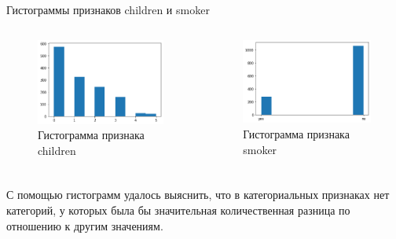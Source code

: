\documentclass[c]{beamer}  %
\begin{document}
	\begin{frame}
		\frametitle{\insertsection}

		\begin{block}{Гистограммы признаков children и smoker}
			\begin{columns}[onlytextwidth,T]
				\begin{figure}[H]
					\centering
					\includegraphics[scale=0.35]{children_hist.png}
					\caption{Гистограмма признака children}
					\label{img:children_hist}
				\end{figure}
				\begin{figure}[H]
					\centering
					\includegraphics[scale=0.35]{smoker_hist.png}
					\caption{Гистограмма признака smoker}
					\label{img:smoker_hist}
				\end{figure}
			\end{columns}
		\end{block}
	\end{frame}

	\begin{frame}
		\frametitle{\insertsection}
		\justifying
		С помощью гистограмм удалось выяснить, что в категориальных признаках нет категорий, у которых
		была бы значительная количественная разница по отношению к другим значениям.
	\end{frame}
\end{document}
